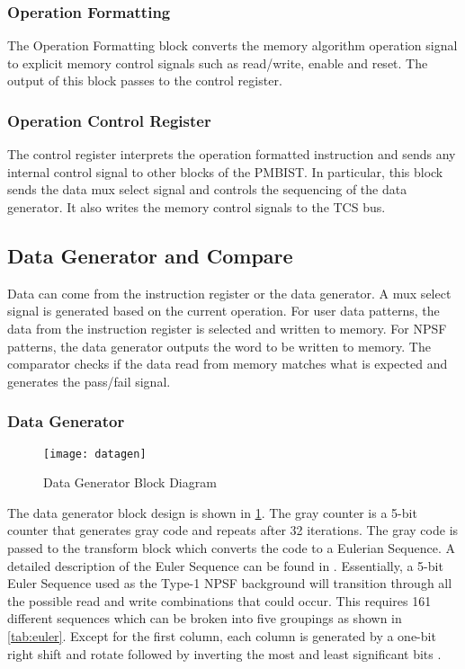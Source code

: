 \subsubsection{Operation Formatting}
The Operation Formatting block converts the memory algorithm operation signal to explicit memory control signals such as read/write, enable and reset.  The output of this block passes to the control register.

\subsubsection{Operation Control Register}
The control register interprets the operation formatted instruction and sends any internal control signal to other blocks of the PMBIST.  In particular, this block sends the data mux select signal and controls the sequencing of the data generator.  It also writes the memory control signals to the TCS bus.  

\subsection{Data Generator and Compare}
Data can come from the instruction register or the data generator.  A mux select signal is generated based on the current operation.  For user data patterns, the data from the instruction register is selected and written to memory.  For NPSF patterns, the data generator outputs the word to be written to memory.  The comparator checks if the data read from memory matches what is expected and generates the pass/fail signal.

\subsubsection{Data Generator}
\begin{figure}[h!]
  \centering
  \texttt{[image: datagen]}
  \caption{Data Generator Block Diagram}
  \label{fig:datagen}
\end{figure}
The data generator block design is shown in \ref{fig:datagen}.  The gray counter is a 5-bit counter that generates gray code and repeats after 32 iterations.  The gray code is passed to the transform block which converts the code to a Eulerian Sequence.  A detailed description of the Euler Sequence can be found in \cite{1675556}.  Essentially, a 5-bit Euler Sequence used as the Type-1 NPSF background will transition through all the possible read and write combinations that could occur.  This requires 161 different sequences which can be broken into five groupings as shown in \ref{tab:euler}.  Except for the first column, each column is generated by a one-bit right shift and rotate followed by inverting the most and least significant bits \cite{00957583}.

